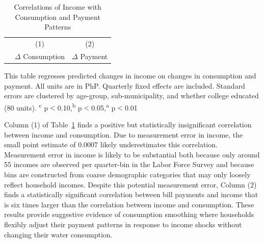 \documentclass[12pt,table]{article}
\begin{document}
\begin{table}[!ht]
\small
\centering
\begin{threeparttable}
\caption{Correlations of Income with Consumption and Payment Patterns}\label{table:lfsanalysis}
\vspace{-2mm}
\begin{tabular}{lcc}
\toprule
 & \small (1) & \small (2)  \\
 & \small $\Delta$ Consumption & \small $\Delta$ Payment \\[.5em]
 \toprule

\bottomrule
\end{tabular}
\begin{tablenotes}
\footnotesize
\item 
This table regresses predicted changes in income on changes in consumption and payment.  All units are in PhP.  Quarterly fixed effects are included.  Standard errors are clustered by age-group, sub-municipality, and whether college educated (80 units).  \textsuperscript{c} p$<$0.10,\textsuperscript{b} p$<$0.05,\textsuperscript{a} p$<$0.01 
\end{tablenotes}
\end{threeparttable}
\end{table}

Column (1) of Table~\ref{table:lfsanalysis} finds a positive but statistically insignificant correlation between income and consumption.  Due to measurement error in income, the small point estimate of 0.0007 likely underestimates this correlation.  Measurement error in income is likely to be substantial both because only around 55 incomes are observed per quarter-bin in the Labor Force Survey and because bins are constructed from coarse demographic categories that may only loosely reflect household incomes.  Despite this potential measurement error, Column (2) finds a statistically significant correlation between bill payments and income that is six times larger than the correlation between income and consumption.  These results provide suggestive evidence of consumption smoothing where households flexibly adjust their payment patterns in response to income shocks without changing their water consumption.  


\end{document}
